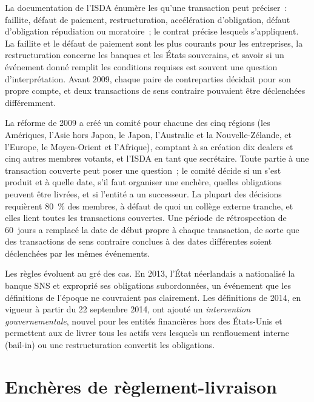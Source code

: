 La documentation de l'ISDA énumère les  qu'une transaction peut préciser~:
faillite, défaut de paiement, restructuration, accélération d'obligation, défaut d'obligation
répudiation ou moratoire~; le contrat précise lesquels s'appliquent. La faillite et le défaut
de paiement sont les plus courants pour les entreprises, la restructuration concerne les banques et les États souverains,
et savoir si un événement donné remplit les conditions requises est souvent une question d'interprétation. Avant
2009, chaque paire de contreparties décidait pour son propre compte, et deux transactions de sens contraire pouvaient
être déclenchées différemment.

La réforme de 2009 a créé un comité pour chacune des cinq régions (les Amériques, l'Asie
hors Japon, le Japon, l'Australie et la Nouvelle-Zélande, et l'Europe, le Moyen-Orient et
l'Afrique), comptant à sa création dix dealers et cinq autres membres votants, et l'ISDA en tant que
secrétaire. Toute partie à une transaction couverte peut poser une question~; le comité décide
si un  s'est produit et à quelle date, s'il faut organiser une enchère, quelles
obligations peuvent être livrées, et si l'entité a un successeur. La plupart des décisions
requièrent 80~\% des membres, à défaut de quoi un collège externe tranche, et elles lient toutes
les transactions couvertes. Une période de rétrospection de 60~jours a remplacé la date de début propre à chaque transaction, de sorte que
des transactions de sens contraire conclues à des dates différentes soient déclenchées par les mêmes événements.

Les règles évoluent au gré des cas. En 2013, l'État néerlandais a nationalisé la banque SNS
et exproprié ses obligations subordonnées, un événement que les définitions de l'époque ne
couvraient pas clairement. Les définitions de 2014, en vigueur à partir du 22 septembre 2014, ont ajouté un
\emph{intervention gouvernementale}, nouvel  pour les entités financières hors des
États-Unis et permettent aux  de livrer tous les actifs vers lesquels un
renflouement interne (bail-in) ou une restructuration convertit les obligations.

\section{Enchères de règlement-livraison}

